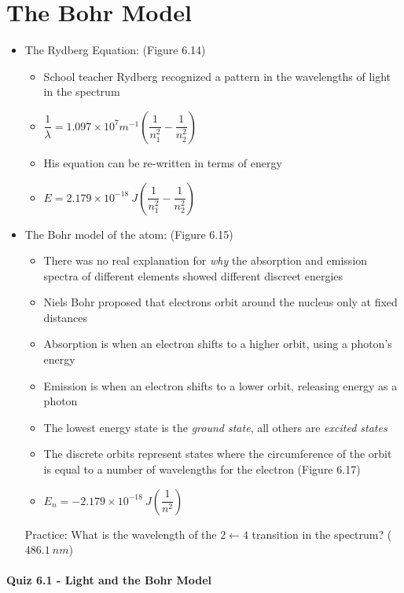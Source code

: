 \documentclass[12pt, openany, letterpaper]{memoir}
\begin{document}
\section{The Bohr Model}
\begin{itemize}
	\item The Rydberg Equation: (Figure 6.14)
	      \begin{itemize}
		      \item School teacher Rydberg recognized a pattern in the wavelengths of light in the  spectrum
          \item $\dfrac{1}{\lambda}=1.097\times10^{7}m^{-1}\left(\dfrac{1}{n_1^2}-\dfrac{1}{n_2^2}\right)$
		      \item His equation can be re-written in terms of energy
		      \item $E=2.179\times10^{-18}~J\left(\dfrac{1}{n_1^2}-\dfrac{1}{n_2^2}\right)$
	      \end{itemize}
	\item The Bohr model of the atom: (Figure 6.15)
	      \begin{itemize}
		      \item There was no real explanation for \emph{why} the absorption and emission spectra of different elements showed different discreet energies
		      \item Niels Bohr proposed that electrons orbit around the nucleus only at fixed distances
		      \item Absorption is when an electron shifts to a higher orbit, using a photon's energy
		      \item Emission is when an electron shifts to a lower orbit, releasing energy as a photon
		      \item The lowest energy state is the \emph{ground state}, all others are \emph{excited states}
		      \item The discrete orbits represent states where the circumference of the orbit is equal to a number of wavelengths for the electron (Figure 6.17)
          \item $E_n=-2.179\times10^{-18}~J\left(\dfrac{1}{n^2}\right)$
	      \end{itemize}
	      Practice: What is the wavelength of the $2\leftarrow4$ transition in the  spectrum? ($486.1~nm$)
\end{itemize}

\paragraph*{Quiz 6.1 - Light and the Bohr Model}
\end{document}
